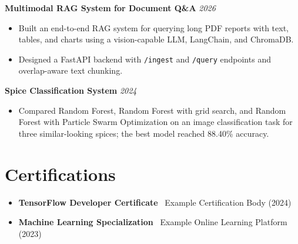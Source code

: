 \documentclass[a4paper,11pt]{article}
\newcommand{\resumeItem}[1]{\item\small{#1}}
\newcommand{\resumeProjectHeading}[2]{
  \vspace{2pt}
  \noindent\textbf{#1} \hfill \textit{\small #2}
  \vspace{-4pt}
}
\begin{document}
\resumeProjectHeading
    {Multimodal RAG System for Document Q\&A}{2026}
\begin{itemize}
  \resumeItem{Built an end-to-end RAG system for querying long PDF reports with text, tables, and charts using a vision-capable LLM, LangChain, and ChromaDB.}
  \resumeItem{Designed a FastAPI backend with \texttt{/ingest} and \texttt{/query} endpoints and overlap-aware text chunking.}
\end{itemize}

\resumeProjectHeading
    {Spice Classification System}{2024}
\begin{itemize}
  \resumeItem{Compared Random Forest, Random Forest with grid search, and Random Forest with Particle Swarm Optimization on an image classification task for three similar-looking spices; the best model reached 88.40\% accuracy.}
\end{itemize}

\section{Certifications}
\begin{itemize}
  \resumeItem{\textbf{TensorFlow Developer Certificate} \textemdash\ Example Certification Body (2024)}
  \resumeItem{\textbf{Machine Learning Specialization} \textemdash\ Example Online Learning Platform (2023)}
\end{itemize}
\end{document}
